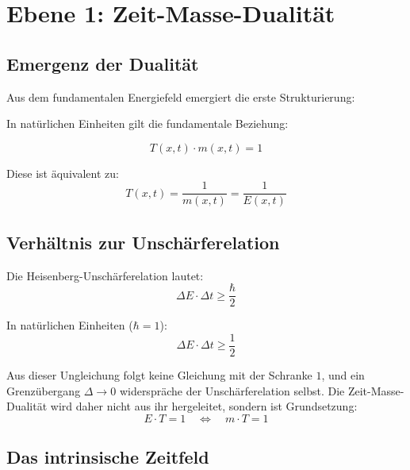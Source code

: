 \section{Ebene 1: Zeit-Masse-Dualität}

\subsection{Emergenz der Dualität}

Aus dem fundamentalen Energiefeld emergiert die erste Strukturierung:

\begin{keyresult}
In natürlichen Einheiten gilt die fundamentale Beziehung:

\begin{equation}
\boxed{T(x,t) \cdot m(x,t) = 1}
\end{equation}

Diese ist äquivalent zu:
\begin{equation}
T(x,t) = \frac{1}{m(x,t)} = \frac{1}{E(x,t)}
\end{equation}
\end{keyresult}

\subsection{Verhältnis zur Unschärferelation}

Die Heisenberg-Unschärferelation lautet:
\begin{equation}
\Delta E \cdot \Delta t \geq \frac{\hbar}{2}
\end{equation}

In natürlichen Einheiten ($\hbar = 1$):
\begin{equation}
\Delta E \cdot \Delta t \geq \frac{1}{2}
\end{equation}

Aus dieser Ungleichung folgt keine Gleichung mit der Schranke $1$, und ein Grenzübergang $\Delta \to 0$ widerspräche der Unschärferelation selbst. Die Zeit-Masse-Dualität wird daher nicht aus ihr hergeleitet, sondern ist Grundsetzung:
\begin{equation}
E \cdot T = 1 \quad \Leftrightarrow \quad m \cdot T = 1
\end{equation}

\subsection{Das intrinsische Zeitfeld}

